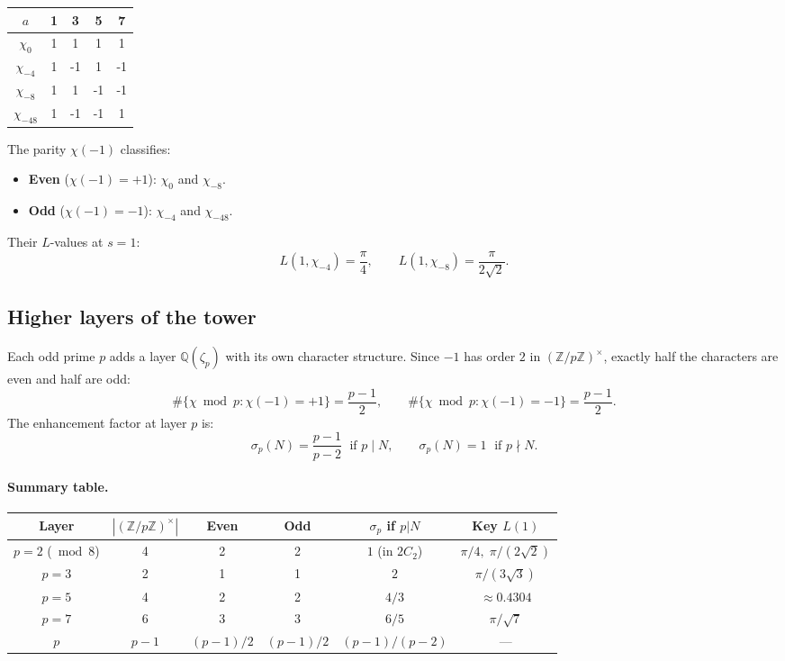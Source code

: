 \documentclass[11pt,a4paper]{article}
\theoremstyle{remark}
\newcommand{\Z}{\mathbb{Z}}
\newcommand{\Q}{\mathbb{Q}}
\begin{document}
\medskip
\begin{center}
\begin{tabular}{c|cccc}
$a$ & 1 & 3 & 5 & 7 \\
\hline
$\chi_0$     &  1 &  1 &  1 &  1 \\
$\chi_{-4}$  &  1 & -1 &  1 & -1 \\
$\chi_{-8}$  &  1 &  1 & -1 & -1 \\
$\chi_{-48}$ &  1 & -1 & -1 &  1 \\
\end{tabular}
\end{center}
\medskip

The parity $\chi(-1)$ classifies:
\begin{itemize}[nosep]
  \item \textbf{Even} ($\chi(-1)=+1$): $\chi_0$ and $\chi_{-8}$.
  \item \textbf{Odd} ($\chi(-1)=-1$): $\chi_{-4}$ and $\chi_{-48}$.
\end{itemize}
Their $L$-values at $s=1$:
\begin{equation}
\label{eq:L-values}
  L(1,\chi_{-4}) = \frac{\pi}{4}, \qquad
  L(1,\chi_{-8}) = \frac{\pi}{2\sqrt{2}}.
\end{equation}

\subsection{Higher layers of the tower}
\label{subsec:higher-layers}

Each odd prime $p$ adds a layer $\Q(\zeta_p)$ with its own character
structure.  Since $-1$ has order $2$ in $(\Z/p\Z)^\times$, exactly half
the characters are even and half are odd:
\begin{equation}
\label{eq:char-split}
  \#\{\chi \bmod p : \chi(-1) = +1\} = \frac{p-1}{2}, \qquad
  \#\{\chi \bmod p : \chi(-1) = -1\} = \frac{p-1}{2}.
\end{equation}
The enhancement factor at layer $p$ is:
\begin{equation}
\label{eq:enhancement}
  \sigma_p(N) = \frac{p-1}{p-2} \;\text{ if } p \mid N, \qquad
  \sigma_p(N) = 1 \;\text{ if } p \nmid N.
\end{equation}

\paragraph{Summary table.}
\begin{center}
\begin{tabular}{c|c|c|c|c|c}
Layer & $|(\Z/p\Z)^\times|$ & Even & Odd & $\sigma_p$ if $p|N$ & Key $L(1)$ \\
\hline
$p=2$ ($\bmod 8$) & 4 & 2 & 2 & $1$ (in $2C_2$) & $\pi/4,\;\pi/(2\sqrt{2})$ \\
$p=3$ & 2 & 1 & 1 & $2$ & $\pi/(3\sqrt{3})$ \\
$p=5$ & 4 & 2 & 2 & $4/3$ & $\approx 0.4304$ \\
$p=7$ & 6 & 3 & 3 & $6/5$ & $\pi/\sqrt{7}$ \\
$p$ & $p-1$ & $(p{-}1)/2$ & $(p{-}1)/2$ & $(p{-}1)/(p{-}2)$ & ---
\end{tabular}
\end{center}
\end{document}
